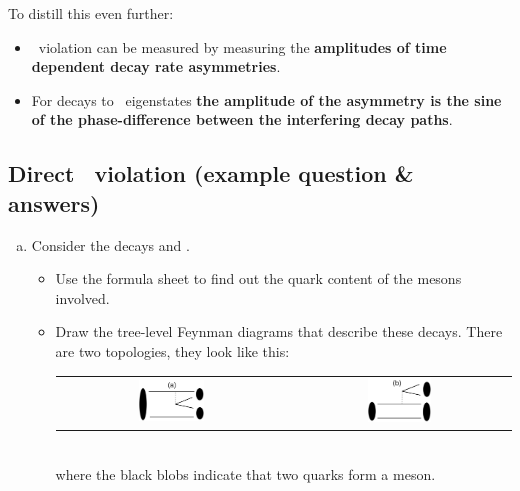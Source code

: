 To distill this even further:
\begin{itemize}
 \item \cp\ violation can be measured by measuring the
 \textbf{amplitudes of time dependent decay rate asymmetries}.
 \item For decays to \cp\ eigenstates \textbf{the amplitude of the
  asymmetry is the sine of the phase-difference between the
  interfering decay paths}.
\end{itemize}

 \subsection{Direct \cp\ violation (example question \& answers)}
\begin{enumerate}[a)]
\item Consider the decays  and . 
 \begin{itemize}
 \item Use the formula sheet to find out the quark content of the mesons involved.
 \item Draw the tree-level Feynman diagrams that describe these decays. There are two topologies, they look like this:\\
 \begin{tabular}{cc}
 \includegraphics[width=0.3\textwidth]{problemsheets/ps2figs/CSup} &
 \includegraphics[width=0.3\textwidth]{problemsheets/ps2figs/CFav}
 \end{tabular}\\
 where the black blobs indicate that two quarks form a meson.
\end{itemize}
\end{enumerate}
